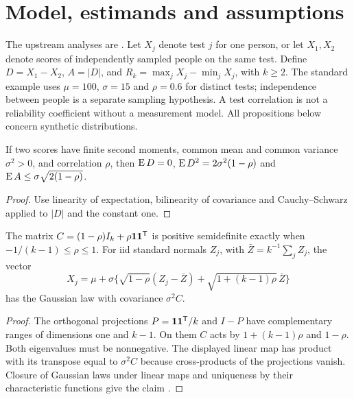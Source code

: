 \chapter{Model, estimands and assumptions}
The upstream analyses are \citep{iqsource,simsource}. Let $X_j$ denote test
$j$ for one person, or let $X_1,X_2$ denote scores of independently sampled
people on the same test. Define $D=X_1-X_2$, $A=|D|$, and
$R_k=\max_j X_j-\min_j X_j$, with $k\ge2$. The standard example uses
$\mu=100$, $\sigma=15$ and $\rho=0.6$ for distinct tests; independence
between people is a separate sampling hypothesis. A test correlation is
not a reliability coefficient without a measurement model.
All propositions below concern synthetic distributions.
\begin{proposition}\label{prop:moments}
If two scores have finite second moments, common mean and common variance
$\sigma^2>0$, and correlation $\rho$, then
$\operatorname{E} D=0$, $\operatorname{E} D^2=2\sigma^2(1-\rho)$ and
$\operatorname{E} A\le \sigma\sqrt{2(1-\rho)}$.
\end{proposition}
\begin{proof}
Use linearity of expectation, bilinearity of covariance and
Cauchy--Schwarz applied to $|D|$ and the constant one.
\end{proof}
\begin{proposition}\label{prop:domain}
The matrix $C=(1-\rho)I_k+\rho\mathbf{1}\mathbf{1}^{\mathsf{T}}$ is positive semidefinite
exactly when $-1/(k-1)\le\rho\le1$.
For iid standard normals $Z_j$, with $\bar Z=k^{-1}\sum_j Z_j$, the vector
\[
X_j=\mu+\sigma\{\sqrt{1-\rho}(Z_j-\bar Z)
+\sqrt{1+(k-1)\rho}\,\bar Z\}
\]
has the Gaussian law with covariance $\sigma^2C$.
\end{proposition}
\begin{proof}
The orthogonal projections $P=\mathbf{1}\mathbf{1}^{\mathsf{T}}/k$ and $I-P$ have complementary
ranges of dimensions one and $k-1$. On them $C$ acts by
$1+(k-1)\rho$ and $1-\rho$. Both eigenvalues must be nonnegative.
The displayed linear map has product with its transpose equal to
$\sigma^2C$ because cross-products of the projections vanish.
Closure of Gaussian laws under linear maps and uniqueness by their
characteristic functions give the claim \citep{anderson}.
\end{proof}
